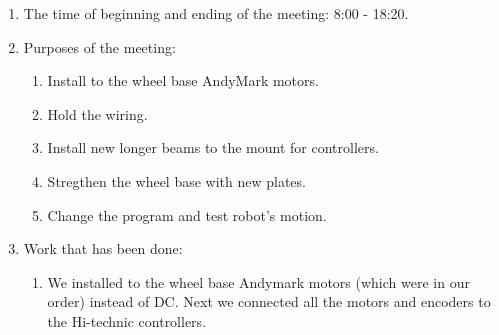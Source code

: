\begin{enumerate}
	
	\item The time of beginning and ending of the meeting: 8:00 - 18:20.
	
	\item Purposes of the meeting: 
	\begin{enumerate}
		
		\item Install to the wheel base AndyMark motors.
		
		\item Hold the wiring.
		
        \item Install new longer beams to the mount for controllers.
        
        \item Stregthen the wheel base with new plates.
        
        \item Change the program and test robot's motion.
		
	\end{enumerate}

	\item Work that has been done:
	\begin{enumerate}
		
		\item We installed to the wheel base Andymark motors (which were in our order) instead of DC. Next we connected all the motors and encoders to the Hi-technic controllers.
		

\end{enumerate}
\end{enumerate}
